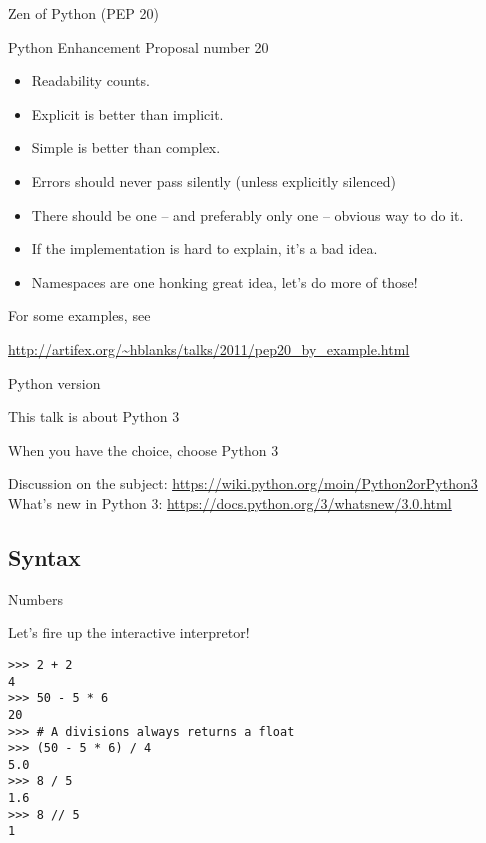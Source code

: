 \documentclass[ignorenonframetext,]{beamer}
\newcommand{\myurl}[1]{\textcolor{blue}{\underline{\url{#1}}}}
\begin{document}
\begin{frame}{Zen of Python (PEP 20)}

    Python Enhancement Proposal number 20

    \begin{itemize}[<+-| alert@+>]
        \item Readability counts.
        \item Explicit is better than implicit.
        \item Simple is better than complex.
        \item Errors should never pass silently (unless explicitly silenced)
        \item There should be one -- and preferably only one -- obvious way to do it.
        \item If the implementation is hard to explain, it's a bad idea.
        \item Namespaces are one honking great idea, let's do more of those!
    \end{itemize}
\end{frame}

\begin{frame}%

    For some examples, see

    \myurl{http://artifex.org/~hblanks/talks/2011/pep20_by_example.html}

\end{frame}

\begin{frame}{Python version}

    This talk is about {\LARGE Python} {\Huge 3}

    When you have the choice, choose Python 3

    Discussion on the subject: \myurl{https://wiki.python.org/moin/Python2orPython3}\\

    What's new in Python 3: \myurl{https://docs.python.org/3/whatsnew/3.0.html}

\end{frame}

\subsection{Syntax}

\begin{frame}[fragile]{Numbers}

    Let's fire up the interactive interpretor!

    \begin{verbatim}
>>> 2 + 2
4
>>> 50 - 5 * 6
20
>>> # A divisions always returns a float
>>> (50 - 5 * 6) / 4
5.0
>>> 8 / 5
1.6
>>> 8 // 5
1
    \end{verbatim}
\end{frame}
\end{document}
